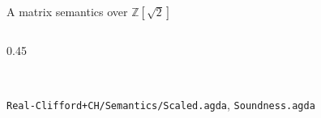 \begin{frame}{A matrix semantics over $\mathbb{Z}[\sqrt2]$ \New}
\begin{columns}[c]
\begin{column}{0.45\textwidth}
\vspace{8pt}
\begin{code}%
\>[0]\AgdaSpace{}%
\AgdaSymbol{:}%
\>[384I]\AgdaSymbol{\{}\AgdaSpace{}%
\AgdaSpace{}%
\AgdaSymbol{:}\AgdaSpace{}%
\AgdaSpace{}%
\AgdaSymbol{\}}\AgdaSpace{}%
\<%
\\
\>[.][@{}l@{}]\<[384I]%
\>[14]\AgdaSpace{}%
\AgdaSpace{}%
\AgdaSpace{}%
\AgdaOperator{\AgdaPostulate{===}}\AgdaSpace{}%
\AgdaSpace{}%
\AgdaSpace{}%
\AgdaSpace{}%
\AgdaSpace{}%
\AgdaSpace{}%
\AgdaOperator{\AgdaFunction{\textasciitilde{}}}\AgdaSpace{}%
\AgdaSpace{}%
\AgdaSpace{}%
\<%
\end{code}
\begin{code}[hide]%
\>[0]\AgdaSpace{}%
\AgdaSymbol{=}\AgdaSpace{}%
\<%
\end{code}
{\scriptsize \texttt{Real-Clifford+CH/Semantics/Scaled.agda}, \texttt{Soundness.agda}}
\end{column}
\end{columns}
\end{frame}

